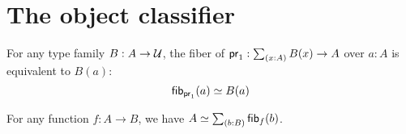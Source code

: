 \documentclass[hott-all.tex]{subfiles}
\begin{document}
%
%

\section{The object classifier}
\label{sec:object-classification}


\begin{lem}\label{thm:fiber-of-a-fibration}
  For any type family $B:A\to\mathcal{U}$, the fiber of $\proj1:\sm{x:A} B(x) \to A$ over $a:A$ is equivalent to $B(a)$:
  \[ {\mathsf{fib}}_{\mathsf{pr}_{1}}(a) \simeq B(a) \]
\end{lem}

\begin{lem}\label{thm:total-space-of-the-fibers}
  For any function $f:A\to B$, we have $\eqv{A}{\sm{b:B}\hfib{f}{b}}$.
\end{lem}
\end{document}
